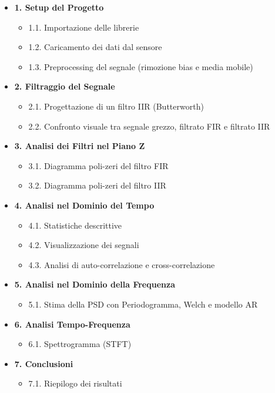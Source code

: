 \documentclass[11pt]{article}
\providecommand{\tightlist}{%
      \setlength{\itemsep}{0pt}\setlength{\parskip}{0pt}}
\begin{document}
\begin{itemize}
\tightlist
\item
  \textbf{1. Setup del Progetto}

  \begin{itemize}
  \tightlist
  \item
    1.1. Importazione delle librerie
  \item
    1.2. Caricamento dei dati dal sensore
  \item
    1.3. Preprocessing del segnale (rimozione bias e media mobile)
  \end{itemize}
\item
  \textbf{2. Filtraggio del Segnale}

  \begin{itemize}
  \tightlist
  \item
    2.1. Progettazione di un filtro IIR (Butterworth)
  \item
    2.2. Confronto visuale tra segnale grezzo, filtrato FIR e filtrato
    IIR
  \end{itemize}
\item
  \textbf{3. Analisi dei Filtri nel Piano Z}

  \begin{itemize}
  \tightlist
  \item
    3.1. Diagramma poli-zeri del filtro FIR
  \item
    3.2. Diagramma poli-zeri del filtro IIR
  \end{itemize}
\item
  \textbf{4. Analisi nel Dominio del Tempo}

  \begin{itemize}
  \tightlist
  \item
    4.1. Statistiche descrittive
  \item
    4.2. Visualizzazione dei segnali
  \item
    4.3. Analisi di auto-correlazione e cross-correlazione
  \end{itemize}
\item
  \textbf{5. Analisi nel Dominio della Frequenza}

  \begin{itemize}
  \tightlist
  \item
    5.1. Stima della PSD con Periodogramma, Welch e modello AR
  \end{itemize}
\item
  \textbf{6. Analisi Tempo-Frequenza}

  \begin{itemize}
  \tightlist
  \item
    6.1. Spettrogramma (STFT)
  \end{itemize}
\item
  \textbf{7. Conclusioni}

  \begin{itemize}
  \tightlist
  \item
    7.1. Riepilogo dei risultati
  \end{itemize}
\end{itemize}
\end{document}
